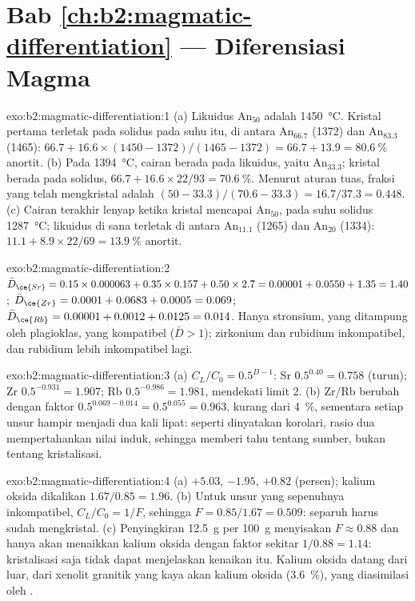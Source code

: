 \section*{Bab \ref{ch:b2:magmatic-differentiation} --- Diferensiasi Magma}

\begin{solution}{exo:b2:magmatic-differentiation:1}
(a) Likuidus An$_{50}$ adalah \qty{1450}{\celsius}. Kristal pertama terletak pada
solidus pada suhu itu, di antara An$_{66.7}$ (1372) dan An$_{83.3}$ (1465):
$66.7 + 16.6\times(1450 - 1372)/(1465 - 1372) = 66.7 + 13.9 = \qty{80.6}{\percent}$
anortit. (b) Pada \qty{1394}{\celsius}, cairan berada pada likuidus, yaitu
An$_{33.3}$; kristal berada pada solidus, $66.7 + 16.6\times22/93 =
\qty{70.6}{\percent}$. Menurut aturan tuas, fraksi yang telah mengkristal adalah $(50 -
33.3)/(70.6 - 33.3) = 16.7/37.3 = 0.448$. (c) Cairan terakhir lenyap ketika
kristal mencapai An$_{50}$, pada suhu solidus \qty{1287}{\celsius}; likuidus
di sana terletak di antara An$_{11.1}$ (1265) dan An$_{20}$ (1334): $11.1 +
8.9\times22/69 = \qty{13.9}{\percent}$ anortit.
\end{solution}

\begin{solution}{exo:b2:magmatic-differentiation:2}
$\bar D_{\ce{Sr}} = 0.15\times0.000063 + 0.35\times0.157 + 0.50\times2.7 = 0.00001 +
0.0550 + 1.35 = 1.40$; $\bar D_{\ce{Zr}} = 0.0001 + 0.0683 + 0.0005 = 0.069$;
$\bar D_{\ce{Rb}} = 0.00001 + 0.0012 + 0.0125 = 0.014$. Hanya stronsium, yang ditampung oleh
plagioklas, yang kompatibel ($\bar D > 1$); zirkonium dan rubidium inkompatibel,
dan rubidium lebih inkompatibel lagi.
\end{solution}

\begin{solution}{exo:b2:magmatic-differentiation:3}
(a) $C_L/C_0 = 0.5^{D-1}$: Sr $0.5^{0.40} = 0.758$ (turun); Zr $0.5^{-0.931} =
1.907$; Rb $0.5^{-0.986} = 1.981$, mendekati limit 2. (b) Zr/Rb berubah dengan faktor
$0.5^{0.069 - 0.014} = 0.5^{0.055} = 0.963$, kurang dari \qty{4}{\percent}, sementara setiap
unsur hampir menjadi dua kali lipat: seperti dinyatakan korolari, rasio dua  mempertahankan nilai  induk, sehingga memberi tahu tentang sumber, bukan
tentang kristalisasi.
\end{solution}

\begin{solution}{exo:b2:magmatic-differentiation:4}
(a)  $+5.03$,  $-1.95$,  $+0.82$ (persen); kalium oksida
dikalikan $1.67/0.85 = 1.96$. (b) Untuk unsur yang sepenuhnya inkompatibel,
$C_L/C_0 = 1/F$, sehingga $F = 0.85/1.67 = 0.509$: separuh  harus sudah
mengkristal. (c) Penyingkiran \qty{12.5}{g} per \qty{100}{g} menyisakan $F \approx 0.88$ dan
hanya akan menaikkan kalium oksida dengan faktor sekitar $1/0.88 = 1.14$: kristalisasi saja tidak dapat
menjelaskan kenaikan itu. Kalium oksida datang dari luar, dari xenolit granitik yang kaya akan
kalium oksida (\qty{3.6}{\percent}), yang diasimilasi oleh .
\end{solution}

